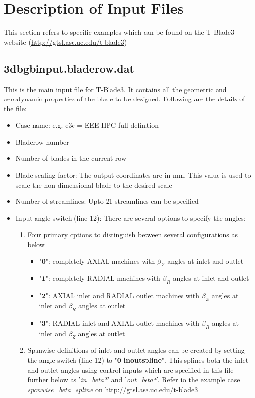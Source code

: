 \documentclass[8pt]{article}
\begin{document}
\section{Description of Input Files}
\noindent
This section refers to specific examples which can be found on the T-Blade3 website (\url{http://gtsl.ase.uc.edu/t-blade3})

\subsection{3dbgbinput.bladerow.dat}\label{maininput}
\noindent
This is the main input file for T-Blade3. It contains all the geometric and aerodynamic properties of the blade to be designed. Following are the details of the file:
\begin{itemize}[leftmargin=*]
    \item Case name: e.g. e3c = EEE HPC full definition
    \item Bladerow number
    \item Number of blades in the current row
    \item Blade scaling factor: The output coordinates are in mm. This value is used to scale the non-dimensional blade to the desired scale
    \item Number of streamlines: Upto 21 streamlines can be specified
    \item Input angle switch (line 12): There are several options to specify the angles:
    \begin{enumerate}[label=\alph*]
        \item Four primary options to distinguish between several configurations as below
        \begin{itemize}[label=\FilledSmallSquare]
            \item "$\mathbf{0}$": completely AXIAL machines with $\beta_{Z}$ angles at inlet and outlet
            \item "$\mathbf{1}$": completely RADIAL machines with $\beta_{R}$ angles at inlet and outlet
            \item "$\mathbf{2}$": AXIAL inlet and RADIAL outlet machines with $\beta_{Z}$ angles at inlet and $\beta_{R}$ angles at outlet
            \item "$\mathbf{3}$": RADIAL inlet and AXIAL outlet machines with $\beta_{R}$ angles at inlet and $\beta_{Z}$ angles at outlet
        \end{itemize}
        \item Spanwise definitions of inlet and outlet angles can be created by setting the angle switch (line 12) to "$\mathbf{0}$ \textbf{inoutspline}". This splines both the inlet and outlet angles using control inputs which are specified in this file further below as '\textit{in\_beta*}' and '\textit{out\_beta*}'. Refer to the example case \textit{spanwise\_beta\_spline} on \url{http://gtsl.ase.uc.edu/t-blade3}

\end{enumerate}
\end{itemize}
\end{document}
